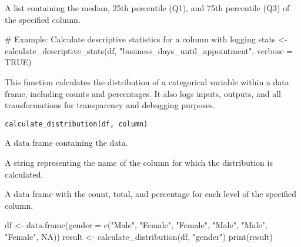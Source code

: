 \documentclass[a4paper]{book}
\begin{document}
%
\begin{Value}
A list containing the median, 25th percentile (Q1), and 75th percentile (Q3) of the specified column.
\end{Value}
%
\begin{Examples}
\begin{ExampleCode}
# Example: Calculate descriptive statistics for a column with logging
stats <- calculate_descriptive_stats(df, "business_days_until_appointment", verbose = TRUE)

\end{ExampleCode}
\end{Examples}
%
\begin{Description}
This function calculates the distribution of a categorical variable within a data frame,
including counts and percentages. It also logs inputs, outputs, and all transformations
for transparency and debugging purposes.
\end{Description}
%
\begin{Usage}
\begin{verbatim}
calculate_distribution(df, column)
\end{verbatim}
\end{Usage}
%
\begin{Arguments}
\begin{ldescription}
\item[\code{df}] A data frame containing the data.

\item[\code{column}] A string representing the name of the column for which the distribution is calculated.
\end{ldescription}
\end{Arguments}
%
\begin{Value}
A data frame with the count, total, and percentage for each level of the specified column.
\end{Value}
%
\begin{Examples}
\begin{ExampleCode}
df <- data.frame(gender = c("Male", "Female", "Female", "Male", "Male", "Female", NA))
result <- calculate_distribution(df, "gender")
print(result)
\end{ExampleCode}
\end{Examples}
\end{document}

